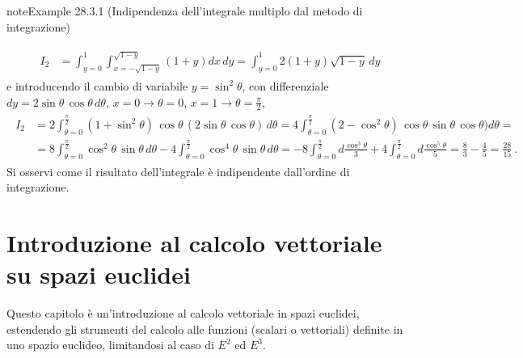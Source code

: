 \documentclass[letterpaper,10pt,italian]{jupyterBook}
\begin{document}
\begin{sphinxadmonition}{note}{Example 28.3.1 (Indipendenza dell’integrale multiplo dal metodo di integrazione)}
\begin{enumerate}
\end{enumerate}
\begin{equation*}
\begin{split}\begin{aligned}
I_2
& = \int_{y=0}^{1} \int_{x=-\sqrt{1-y}}^{\sqrt{1-y}} \left( 1 + y \right) dx \, dy 
  = \int_{y=0}^{1} 2 ( 1 + y )\sqrt{1-y} \, dy 
\end{aligned}\end{split}
\end{equation*}
\sphinxAtStartPar
e introducendo il cambio di variabile \(y = \sin^2 \theta\), con differenziale \(dy = 2 \sin \theta \, \cos \theta \, d \theta\), \(x=0 \rightarrow \theta = 0\), \(x = 1 \rightarrow \theta = \frac{\pi}{2}\),
\begin{equation*}
\begin{split}\begin{aligned}
I_2 
& =  2 \int_{\theta=0}^{\frac{\pi}{2}} (1 + \sin^2 \theta) \, \cos \theta \, ( 2 \sin \theta \, \cos \theta ) \, d \theta
  =  4 \int_{\theta=0}^{\frac{\pi}{2}} (2 - \cos^2 \theta) \, \cos \theta \, \sin \theta \, \cos \theta )  d \theta = \\
& =  8 \int_{\theta=0}^{\frac{\pi}{2}} \cos^2 \theta \, \sin \theta \,  d \theta
   - 4 \int_{\theta=0}^{\frac{\pi}{2}} \cos^4 \theta \, \sin \theta \,  d \theta 
  =- 8 \int_{\theta=0}^{\frac{\pi}{2}} d \frac{\cos^3 \theta}{3}
   + 4 \int_{\theta=0}^{\frac{\pi}{2}} d \frac{\cos^5 \theta}{5} 
  = \frac{8}{3} - \frac{4}{5} = \frac{28}{15} \ .
\end{aligned}\end{split}
\end{equation*}
\sphinxAtStartPar
Si osservi come il risultato dell’integrale è indipendente dall’ordine di integrazione.


\end{sphinxadmonition}



\sphinxstepscope


\chapter{Introduzione al calcolo vettoriale su spazi euclidei}
\label{\detokenize{ch/vector-calculus:introduzione-al-calcolo-vettoriale-su-spazi-euclidei}}\label{\detokenize{ch/vector-calculus:vector-calculus}}\label{\detokenize{ch/vector-calculus::doc}}
\sphinxAtStartPar
Questo capitolo è un’introduzione al calcolo vettoriale in spazi euclidei, estendendo gli strumenti del calcolo alle funzioni (scalari o vettoriali) definite in uno spazio euclideo, limitandosi al caso di \(E^2\) ed \(E^3\).
\end{document}
